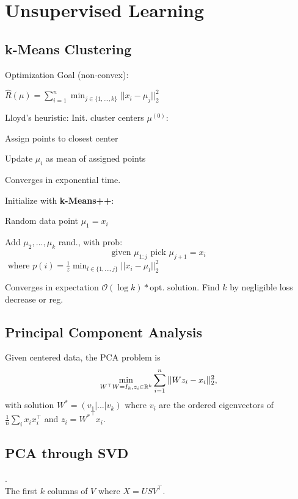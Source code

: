\section*{Unsupervised Learning}

\subsection*{k-Means Clustering}

Optimization Goal (non-convex):

\qquad $\hat{R} (\mu) = \sum_{i=1}^n \min_{j\in \{1,...,k\}} ||x_i - \mu_j||_2^2$

Lloyd's heuristic:
Init. cluster centers $\mu^{(0)}$:
\begin{compactitem}
	\item Assign points to closest center				
	\item Update $\mu_i$ as mean of assigned points
\end{compactitem}

Converges in exponential time.

Initialize with \textbf{k-Means++}:

\begin{compactitem}
	\item Random data point $\mu_1 = x_i$
	\item Add $\mu_2,...,\mu_k$ rand., with prob:
		$$\text{given } \mu_{1:j} \text{ pick } \mu_{j+1} = x_i$$ 
		$\text{ where } p(i) = \frac{1}{z} \min_{l \in \{1,...,j\}} ||x_i - \mu_l||_2^2$
\end{compactitem}
Converges in expectation $\mathcal O (\log k) * \text{opt. solution}$.
Find $k$ by negligible loss decrease or reg.

\subsection*{Principal Component Analysis}

Given centered data, the PCA problem is 
$$\min_{W^\top W=I_k,z_i\in\mathbb{R}^k}\sum_{i=1}^n||W z_i - x_i||_2^2,$$
with solution $W^* = (v_1|...|v_k)$ where $v_i$ are the ordered 
eigenvectors of $\frac{1}{n}\sum_ix_ix_i^\top$ 
and $z_i = {W^*}^\top x_i$. 

\subsection*{PCA through SVD}
\color{White} . \color {Black}\\[-10pt]
The first $k$ columns of $V$ where $X = U S V^\top$.

